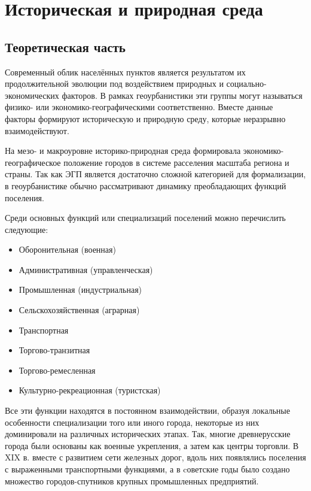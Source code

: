 \documentclass[
  11pt,
  russian,
]{book}
\providecommand{\tightlist}{%
  \setlength{\itemsep}{0pt}\setlength{\parskip}{0pt}}
\begin{document}
\hypertarget{history}{%
\chapter{Историческая и природная среда}\label{history}}

\hypertarget{ux442ux435ux43eux440ux435ux442ux438ux447ux435ux441ux43aux430ux44f-ux447ux430ux441ux442ux44c}{%
\section*{Теоретическая часть}\label{ux442ux435ux43eux440ux435ux442ux438ux447ux435ux441ux43aux430ux44f-ux447ux430ux441ux442ux44c}}

Современный облик населённых пунктов является результатом их продолжительной эволюции под воздействием природных и социально-экономических факторов. В рамках геоурбанистики эти группы могут называться физико- или экономико-географическими соответственно. Вместе данные факторы формируют историческую и природную среду, которые неразрывно взаимодействуют.

На мезо- и макроуровне историко-природная среда формировала экономико-географическое положение городов в системе расселения масштаба региона и страны. Так как ЭГП является достаточно сложной категорией для формализации, в геоурбанистике обычно рассматривают динамику преобладающих функций поселения.

Среди основных функций или специализаций поселений можно перечислить следующие:

\begin{itemize}
\tightlist
\item
  Оборонительная (военная)
\item
  Административная (управленческая)
\item
  Промышленная (индустриальная)
\item
  Сельскохозяйственная (аграрная)
\item
  Транспортная
\item
  Торгово-транзитная
\item
  Торгово-ремесленная
\item
  Культурно-рекреационная (туристская)
\end{itemize}

Все эти функции находятся в постоянном взаимодействии, образуя локальные особенности специализации того или иного города, некоторые из них доминировали на различных исторических этапах. Так, многие древнерусские города были основаны как военные укрепления, а затем как центры торговли. В XIX в. вместе с развитием сети железных дорог, вдоль них появлялись поселения с выраженными транспортными функциями, а в cоветские годы было создано множество городов-спутников крупных промышленных предприятий.
\end{document}
